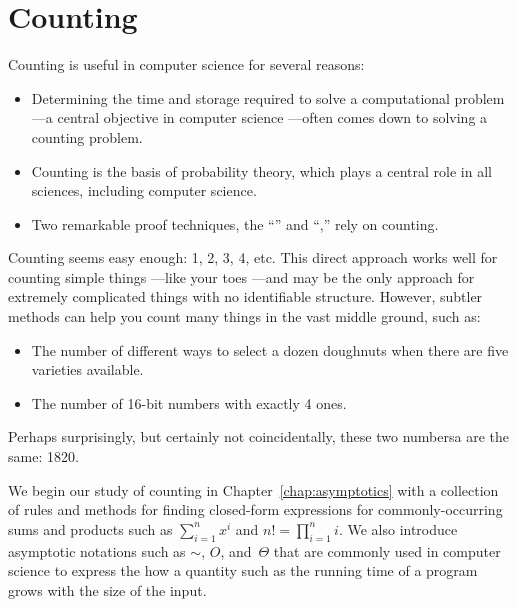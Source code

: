 \part{Counting}
\label{part:counting}

\partintro
Counting is useful in computer science for several reasons:
\begin{itemize}

\item

Determining the time and storage required to solve a computational
problem ---a central objective in computer science ---often comes down
to solving a counting problem.

\item

Counting is the basis of probability theory, which plays a central
role in all sciences, including computer science.

\item

Two remarkable proof techniques, the ``''
and ``,'' rely on counting.
\iffalse
These lead to a variety of interesting and useful insights.
\fi

\end{itemize}

Counting seems easy enough: 1, 2, 3, 4, etc.  This direct approach
works well for counting simple things ---like your toes ---and may be
the only approach for extremely complicated things with no
identifiable structure.  However, subtler methods can help you count
many things in the vast middle ground, such as:
\begin{itemize}

\item The number of different ways to select a dozen doughnuts when
there are five varieties available.

\item The number of 16-bit numbers with exactly 4 ones.

\end{itemize}
Perhaps surprisingly, but certainly not coincidentally, these two
numbersa are the same: 1820.

We begin our study of counting in Chapter~\ref{chap:asymptotics} with
a collection of rules and methods for finding closed-form expressions
for commonly-occurring sums and products such as $\sum_{i = 1}^n x^i$
and $n! = \prod_{i=1}^n i$.  We also introduce asymptotic notations
such as $\sim$, $O$, and~$\Theta$ that are commonly used in computer
science to express the how a quantity such as the running time of a
program grows with the size of the input.

